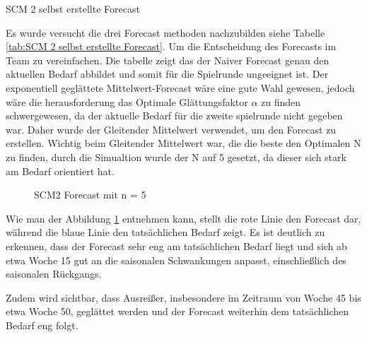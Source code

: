 \documentclass[a4paper,12pt]{article}
\begin{document}
\begin{table}[H]
    \centering
    \caption{SCM 2 selbst erstellte Forecast}
    \label{tab:SCM 2 selbst erstellte Forecast}
\end{table}

Es wurde versucht die drei Forecast methoden nachzubilden siehe Tabelle \ref{tab:SCM 2 selbst erstellte Forecast}. 
Um die Entscheidung des Forecasts im Team zu vereinfachen.
Die tabelle zeigt das der Naiver Forecast genau den aktuellen Bedarf abbildet und somit für die Spielrunde ungeeignet ist.
Der exponentiell geglättete Mittelwert-Forecast wäre eine gute Wahl gewesen,
jedoch wäre die herausforderung das Optimale Glättungsfaktor $\alpha$ zu finden schwergewesen, da der aktuelle Bedarf für die zweite spielrunde nicht gegeben war.
Daher wurde der Gleitender Mittelwert verwendet, um den Forecast zu erstellen.
Wichtig beim Gleitender Mittelwert war, die die beste den Optimalen N zu finden,
durch die Simualtion wurde der N auf 5 gesetzt, da dieser sich stark am Bedarf orientiert hat.
\begin{figure}[H]
    \centering
    \caption{SCM2 Forecast mit n = 5}
    \label{fig:SCM2 Forecast mit n = 5}
\end{figure}
Wie man der Abbildung \ref{fig:SCM2 Forecast mit n = 5} entnehmen kann,
stellt die rote Linie den Forecast dar, während die blaue Linie den tatsächlichen Bedarf zeigt.
Es ist deutlich zu erkennen, dass der Forecast sehr eng am tatsächlichen Bedarf liegt und sich ab etwa Woche 15 gut an die saisonalen Schwankungen anpasst, einschließlich des saisonalen Rückgangs.

Zudem wird sichtbar, dass Ausreißer, insbesondere im Zeitraum von Woche 45 bis etwa Woche 50, geglättet werden und der Forecast weiterhin dem tatsächlichen Bedarf eng folgt.
\end{document}
